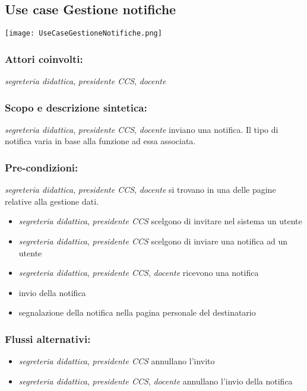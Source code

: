 \documentclass[11pt,a4paper]{article}
\begin{document}
\subsection{Use case Gestione notifiche}
\begin{center} 
 \texttt{[image: UseCaseGestioneNotifiche.png]} 
\end{center}
\subsubsection*{Attori coinvolti:}
\textit{segreteria didattica}, \textit{presidente CCS}, \textit{docente}
\subsubsection*{Scopo e descrizione sintetica:}
\textit{segreteria didattica}, \textit{presidente CCS}, \textit{docente} inviano una notifica. Il tipo di notifica varia in base alla funzione ad essa associata.
\subsubsection*{Pre-condizioni:}
\textit{segreteria didattica}, \textit{presidente CCS}, \textit{docente} si trovano in una delle pagine relative alla gestione dati.
\begin{itemize}
 \item \textit{segreteria didattica}, \textit{presidente CCS} scelgono di invitare nel sistema un utente
\item \textit{segreteria didattica}, \textit{presidente CCS} scelgono di inviare una notifica ad un utente
\item \textit{segreteria didattica}, \textit{presidente CCS}, \textit{docente} ricevono una notifica
\end{itemize}
\begin{itemize}
 \item invio della notifica
 \item segnalazione della notifica nella pagina personale del destinatario
\end{itemize}
\subsubsection*{Flussi alternativi:}
\begin{itemize}
\item \textit{segreteria didattica}, \textit{presidente CCS} annullano l'invito
\item \textit{segreteria didattica}, \textit{presidente CCS}, \textit{docente} annullano l'invio della notifica
\end{itemize}
\end{document}
